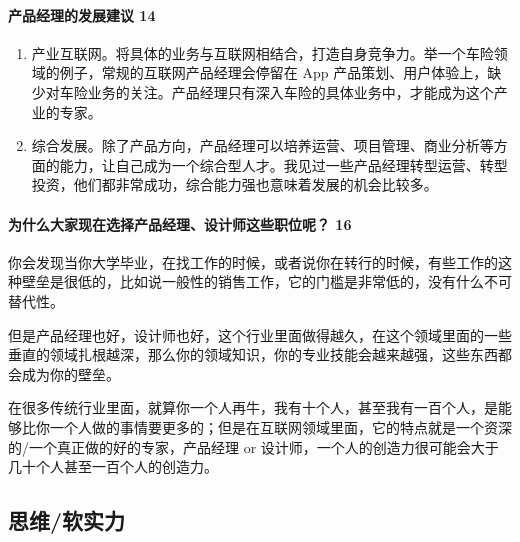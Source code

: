 \documentclass[letterpaper,10pt,english]{sphinxmanual}
\begin{document}
\paragraph{产品经理的发展建议 14\sphinxfootnotemark[368]}
\label{\detokenize{chapter_introduction/career_path:id25}}%
\begin{footnotetext}[368]\sphinxAtStartFootnote
{}
%
\end{footnotetext}\ignorespaces \begin{enumerate}
%
\item {} 
产业互联网。将具体的业务与互联网相结合，打造自身竞争力。举一个车险领域的例子，常规的互联网产品经理会停留在
App
产品策划、用户体验上，缺少对车险业务的关注。产品经理只有深入车险的具体业务中，才能成为这个产业的专家。

\item {} 
综合发展。除了产品方向，产品经理可以培养运营、项目管理、商业分析等方面的能力，让自己成为一个综合型人才。我见过一些产品经理转型运营、转型投资，他们都非常成功，综合能力强也意味着发展的机会比较多。

\end{enumerate}


\paragraph{为什么大家现在选择产品经理、设计师这些职位呢？ 16\sphinxfootnotemark[369]}
\label{\detokenize{chapter_introduction/career_path:id26}}%
\begin{footnotetext}[369]\sphinxAtStartFootnote
{}
%
\end{footnotetext}\ignorespaces 
你会发现当你大学毕业，在找工作的时候，或者说你在转行的时候，有些工作的这种壁垒是很低的，比如说一般性的销售工作，它的门槛是非常低的，没有什么不可替代性。

但是产品经理也好，设计师也好，这个行业里面做得越久，在这个领域里面的一些垂直的领域扎根越深，那么你的领域知识，你的专业技能会越来越强，这些东西都会成为你的壁垒。

在很多传统行业里面，就算你一个人再牛，我有十个人，甚至我有一百个人，是能够比你一个人做的事情要更多的；但是在互联网领域里面，它的特点就是一个资深的/一个真正做的好的专家，产品经理
or 设计师，一个人的创造力很可能会大于几十个人甚至一百个人的创造力。


\subsection{思维/软实力}
\label{\detokenize{chapter_idea/index:chap-idea}}\label{\detokenize{chapter_idea/index:id1}}\label{\detokenize{chapter_idea/index::doc}}
\end{document}
